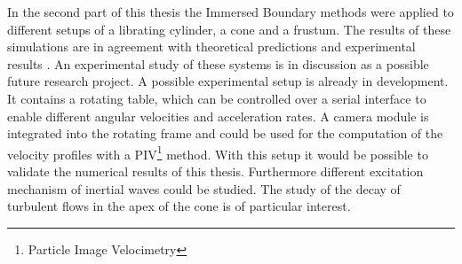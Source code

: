 In the second part of this thesis the Immersed Boundary methods were applied to different setups of a librating cylinder,  a cone and a frustum.
The results of these simulations are in agreement with theoretical
predictions \citep{Greenspan1969} and experimental results \cite{Beardsley1970}.
An experimental study of these systems is in discussion as a possible future research project.
A possible experimental setup is already in development.
It contains a rotating table, which can be controlled over a serial interface to enable different angular velocities and acceleration rates.
A camera module is integrated into the rotating frame and could be used for the computation
of the velocity profiles with a PIV\footnote{Particle Image Velocimetry}
method.
With this setup it would be possible to validate the numerical results of this thesis.
Furthermore different excitation mechanism of inertial waves could be studied.
The study of the decay of turbulent flows in the apex of the cone is of particular interest.



